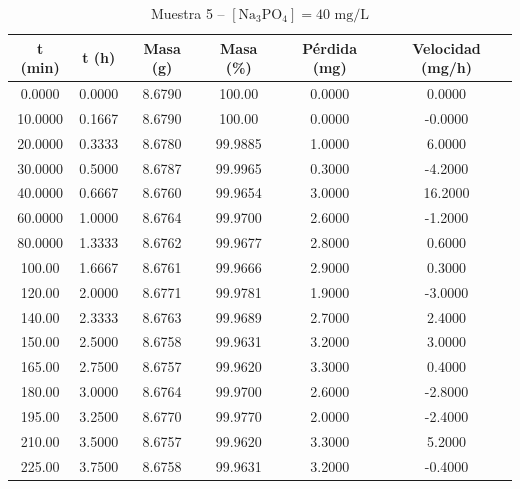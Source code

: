 \documentclass[11pt,a4paper]{article}
\begin{document}
\begin{table}[H]
\centering
\caption{Muestra 5 -- $[\text{Na}_3\text{PO}_4] = 40\text{ mg/L}$}
\label{tab:3_4_c40_m5}
\begin{tabular}{cccccc}
\toprule
t (min) & t (h) & Masa (g) & Masa (\%) & Pérdida (mg) & Velocidad (mg/h) \\
\midrule
0.0000 & 0.0000 & 8.6790 & 100.00 & 0.0000 & 0.0000 \\
10.0000 & 0.1667 & 8.6790 & 100.00 & 0.0000 & -0.0000 \\
20.0000 & 0.3333 & 8.6780 & 99.9885 & 1.0000 & 6.0000 \\
30.0000 & 0.5000 & 8.6787 & 99.9965 & 0.3000 & -4.2000 \\
40.0000 & 0.6667 & 8.6760 & 99.9654 & 3.0000 & 16.2000 \\
60.0000 & 1.0000 & 8.6764 & 99.9700 & 2.6000 & -1.2000 \\
80.0000 & 1.3333 & 8.6762 & 99.9677 & 2.8000 & 0.6000 \\
100.00 & 1.6667 & 8.6761 & 99.9666 & 2.9000 & 0.3000 \\
120.00 & 2.0000 & 8.6771 & 99.9781 & 1.9000 & -3.0000 \\
140.00 & 2.3333 & 8.6763 & 99.9689 & 2.7000 & 2.4000 \\
150.00 & 2.5000 & 8.6758 & 99.9631 & 3.2000 & 3.0000 \\
165.00 & 2.7500 & 8.6757 & 99.9620 & 3.3000 & 0.4000 \\
180.00 & 3.0000 & 8.6764 & 99.9700 & 2.6000 & -2.8000 \\
195.00 & 3.2500 & 8.6770 & 99.9770 & 2.0000 & -2.4000 \\
210.00 & 3.5000 & 8.6757 & 99.9620 & 3.3000 & 5.2000 \\
225.00 & 3.7500 & 8.6758 & 99.9631 & 3.2000 & -0.4000 \\
\bottomrule
\end{tabular}
\end{table}
\end{document}
